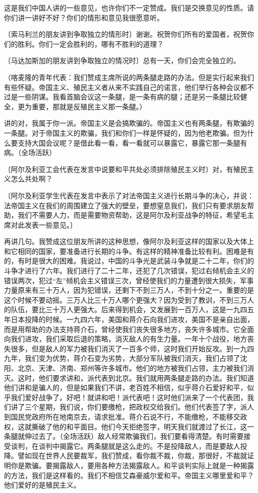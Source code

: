 这是我们中国人讲的一些意见，也许你们不一定赞成。我们是交换意见的性质。请你们讲一讲好不好？你们的情形和意见我很愿意听。

〔索马利兰的朋友讲到争取独立的情形时〕谢谢。祝贺你们所有的爱国者，祝贺你们的胜利。你们一定会胜利的，哪有不胜利的道理？

〔马达加斯加的朋友讲到争取独立的情况时〕总有一天，你们会完全独立的。


（喀麦隆的青年代表：我们赞成主席所说的两条腿走路的办法。但是实行起来我们有些怀疑。帝国主义、殖民主义者从来不实践自己的诺言，他们举行各种会议都不过是一些阴谋。我看首脑会议这一条腿，是一条有病的腿；还是另一条腿比较健全，更为重要，那就是反殖民主义那一条腿。）

讲的对，我属于你一派。帝国主义是会搞欺骗的。帝国主义也有两条腿，有欺骗的一条腿。对于帝国主义的欺骗，我们和你们一样是怀疑的，因为他老欺骗。但为什么要支持大国会议呢？是借此看一看，看一看就可以暴露它，暴露它那一条腿有病。（全场活跃）

〔阿尔及利亚工会代表在发言中说要和平共处必须排除殖民主义时〕对，有殖民主义怎么共处啊？

〔阿尔及利亚学生代表在发言中表示了对法帝国主义进行长期斗争的决心，并说：法帝国主义在我们的周围建立了强大的壁垒，要想窒息我们，我们只有要求朋友帮助，我们不需要人力，而是需要物资帮助，这是阿尔及利亚战争的特征，希望毛主席对此发表一些意见。〕

再讲几句。我赞成这位朋友所讲的这种思想，像阿尔及利亚这样的国家以及大体上和它相同的国家，要准备进行长期的斗争。有这样的精神准备比较有利。困难是有的，有时是很大的困难。我说过，中国的斗争光是武装斗争就是二十二年，你们的斗争才进行了六年。我们进行了二十二年，还犯了几次错误，犯过右倾机会主义的错误两次，犯过“左”倾机会主义错误三次，曾经使我们的力量遭到很大损失，军事力量原来有三十万人，因为犯错误，还剩下不到三万人，不到十分之一。重要的是这个时候不要动摇。三万人比三十万人哪个更强大？因为受到了教训，不到三万人的队伍，要比三十万人更强大。后来得到机会，又发展到一百万人，这是一九四五年日本投降的时候。一九四六年，美国和蒋介石向我们进攻，美国不是亲自出面，而是用帮助的办法支持蒋介石，曾经使我们丧失很多地方，丧失许多城市。它全面向我们进攻，我们采取后退的策略，消灭敌人的有生力量。一年十个战役，地方丧失很多，但是敌人的军力被我们消灭了一百多个师，这时我们开始反攻。到一九四九年，我们变为优势，蒋介石变为劣势，大部分军队被我们消灭，我们占领了沈阳、北京、天津、济南、郑州等许多城市。他们的地方被我们占领，主力被我们消灭。这时，他们要求讲和，派代表到北京。我们就用两条腿走路的办法。我们知道他们讲和是骗人的，但是如果我们不讲，老百姓不相信，似乎蒋介石爱好和平，似乎我们爱好战争了。好吧！就讲和吧！派代表吧！这时他们派来了一个代表团，我们讲了三个星期，我们说，你们要缴枪，把政权交给我们。他们代表签了字，派人到国民党政府所在地南京去，请求批准。蒋介石说不行，不能缴枪，不能移交政权，这就撕破了他的和平面目。他们今天拒绝签字，明天我们就渡过了长江，这一条腿就伸过去了。（全场活跃）敌人经常欺骗我们，我们要看得清楚。有时需要接受谈判，在谈判中揭露它。两条腿就是这么走的。不是投降敌人，而是要敌人投降。譬如现在世界人民要裁军，我们赞成，看你裁不裁，你裁，那很好，不裁就证明你是欺骗。要揭露敌人，要用各种方法揭露敌人。和平谈判实际上就是一种揭露的方法，我们是这样看的。我们不相信艾森豪威尔爱和平。帝国主义哪里爱和平？他们爱好的是殖民主义。

